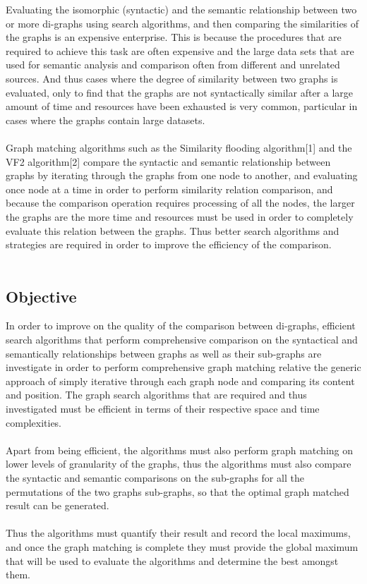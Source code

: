 \label{Problem Statement}
Evaluating the isomorphic (syntactic) and the semantic relationship between two or more di-graphs using search algorithms, and then comparing the similarities of the graphs is an expensive enterprise. This is because the procedures that are required to achieve this task are often expensive and the large data sets that are used for semantic analysis and comparison often from different and unrelated sources. And thus cases where the degree of similarity between two graphs is evaluated, only to find that the graphs are not syntactically similar after a large amount of time and resources have been exhausted is very common, particular in cases where the graphs contain large datasets.\\\\
Graph matching algorithms such as the Similarity flooding algorithm[1] and the VF2 algorithm[2] compare the syntactic and semantic relationship between graphs by iterating through the graphs from one node to another, and evaluating once node at a time in order to perform similarity relation comparison, and because the comparison operation requires processing of all the nodes, the larger the graphs are the more time and resources must be used in order to completely evaluate this relation between the graphs. Thus better search algorithms and strategies are required in order to improve the efficiency of the comparison.\\\\

\subsection{Objective}
In order to improve on the quality of the comparison between di-graphs, efficient search algorithms that perform comprehensive comparison on the syntactical and semantically relationships between graphs as well as their sub-graphs are investigate in order to perform comprehensive graph matching relative the generic approach of simply iterative through each graph node and comparing its content and position. The graph search algorithms that are required and thus investigated must be efficient in terms of their respective space and time complexities.\\\\
Apart from being efficient, the algorithms must also perform graph matching on lower levels of granularity of the graphs, thus the algorithms must also compare the syntactic and semantic comparisons on the sub-graphs for all the permutations of the two graphs sub-graphs, so that the optimal graph matched result can be generated.\\\\
Thus the algorithms must quantify their result and record the local maximums, and once the graph matching is complete they must provide the global maximum that will be used to evaluate the algorithms and determine the best amongst them.\\\\

